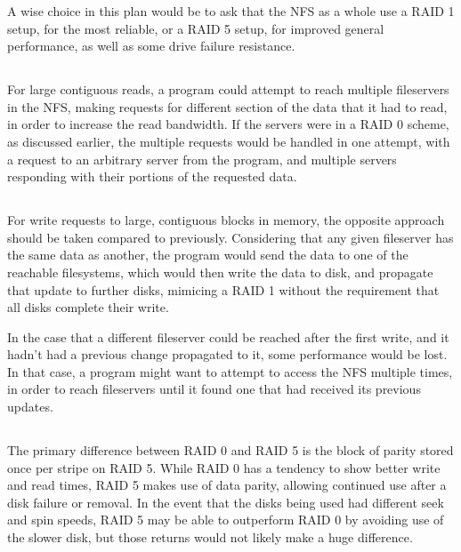\documentclass{article}
\begin{document}
A wise choice in this plan would be to ask that the NFS as a whole use a RAID 1 setup, for the most reliable, or a RAID 5 setup, for improved general performance, as well as some drive failure resistance.

\subsection{}
For large contiguous reads, a program could attempt to reach multiple fileservers in the NFS, making requests for different section of the data that it had to read, in order to increase the read bandwidth. If the servers were in a RAID 0 scheme, as discussed earlier, the multiple requests would be handled in one attempt, with a request to an arbitrary server from the program, and multiple servers responding with their portions of the requested data.

\subsection{}
For write requests to large, contiguous blocks in memory, the opposite approach should be taken compared to previously. Considering that any given fileserver has the same data as another, the program would send the data to one of the reachable filesystems, which would then write the data to disk, and propagate that update to further disks, mimicing a RAID 1 without the requirement that all disks complete their write.

In the case that a different fileserver could be reached after the first write, and it hadn't had a previous change propagated to it, some performance would be lost. In that case, a program might want to attempt to access the NFS multiple times, in order to reach fileservers until it found one that had received its previous updates.

\subsection{}
The primary difference between RAID 0 and RAID 5 is the block of parity stored once per stripe on RAID 5. While RAID 0 has a tendency to show better write and read times, RAID 5 makes use of data parity, allowing continued use after a disk failure or removal. In the event that the disks being used had different seek and spin speeds, RAID 5 may be able to outperform RAID 0 by avoiding use of the slower disk, but those returns would not likely make a huge difference.
\end{document}
